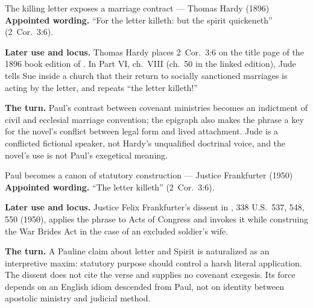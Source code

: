\begin{afterlife}{The killing letter exposes a marriage contract --- Thomas Hardy (1896)}
\textbf{Appointed wording.} ``For the letter killeth: but the spirit
quickeneth'' (2~Cor.~3:6).

\textbf{Later use and locus.} Thomas Hardy places 2~Cor.~3:6 on the title page
of the 1896 book edition of . In Part VI, ch.~VIII
(ch.~50 in the linked edition), Jude tells Sue inside a church that their
return to socially sanctioned marriages is acting by the letter, and repeats
``the letter killeth!''

\textbf{The turn.} Paul's contrast between covenant ministries
becomes an indictment of civil and ecclesial marriage convention; the epigraph
also makes the phrase a key for the novel's conflict between legal form and
lived attachment. Jude is a conflicted fictional speaker, not Hardy's
unqualified doctrinal voice, and the novel's use is not Paul's exegetical
meaning.
\end{afterlife}

\begin{afterlife}{Paul becomes a canon of statutory construction --- Justice Frankfurter (1950)}
\textbf{Appointed wording.} ``The letter killeth'' (2~Cor.~3:6).

\textbf{Later use and locus.} Justice Felix Frankfurter's dissent in
, 338 U.S.~537, 548, 550
(1950), applies the phrase to Acts of Congress and invokes it while construing
the War Brides Act in the case of an excluded soldier's wife.

\textbf{The turn.} A Pauline claim about letter and Spirit is
naturalized as an interpretive maxim: statutory purpose should control a harsh
literal application. The dissent does not cite the verse and supplies no
covenant exegesis. Its force depends on an English idiom descended from Paul,
not on identity between apostolic ministry and judicial method.
\end{afterlife}
